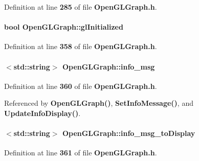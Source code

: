 Definition at line {\bf 285} of file {\bf Open\+G\+L\+Graph.\+h}.

\paragraph[{gl\+Initialized}]{\setlength{\rightskip}{0pt plus 5cm}bool Open\+G\+L\+Graph\+::gl\+Initialized\hspace{0.3cm}{\ttfamily [private]}}\label{classOpenGLGraph_a3a3ffae3aa9ec3993ded94ac31942616}


Definition at line {\bf 358} of file {\bf Open\+G\+L\+Graph.\+h}.

\paragraph[{info\+\_\+msg}]{$<$std\+::string$>$ Open\+G\+L\+Graph\+::info\+\_\+msg\hspace{0.3cm}{\ttfamily [private]}}\label{classOpenGLGraph_aec98359d9ce1401a0d56b56094e8b251}


Definition at line {\bf 360} of file {\bf Open\+G\+L\+Graph.\+h}.



Referenced by {\bf Open\+G\+L\+Graph()}, {\bf Set\+Info\+Message()}, and {\bf Update\+Info\+Display()}.

\paragraph[{info\+\_\+msg\+\_\+to\+Display}]{$<$std\+::string$>$ Open\+G\+L\+Graph\+::info\+\_\+msg\+\_\+to\+Display\hspace{0.3cm}{\ttfamily [private]}}\label{classOpenGLGraph_a04a2187021ff366ed81d5e005c9f8979}


Definition at line {\bf 361} of file {\bf Open\+G\+L\+Graph.\+h}.



